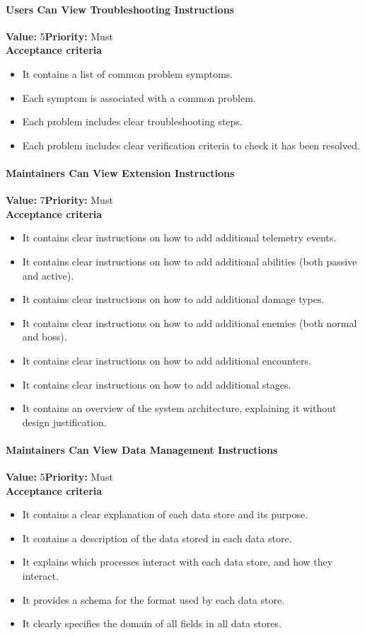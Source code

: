 \paragraph{Users Can View Troubleshooting Instructions}
\textbf{Value:} 5\quad \textbf{Priority:} Must\\
\textbf{Acceptance criteria}
\begin{itemize}
  \item It contains a list of common problem symptoms.
  \item Each symptom is associated with a common problem.
  \item Each problem includes clear troubleshooting steps.
  \item Each problem includes clear verification criteria to check it has been resolved.
\end{itemize}

\paragraph{Maintainers Can View Extension Instructions}
\textbf{Value:} 7\quad \textbf{Priority:} Must\\
\textbf{Acceptance criteria}
\begin{itemize}
  \item It contains clear instructions on how to add additional telemetry events.
  \item It contains clear instructions on how to add additional abilities (both passive and active).
  \item It contains clear instructions on how to add additional damage types.
  \item It contains clear instructions on how to add additional enemies (both normal and boss).
  \item It contains clear instructions on how to add additional encounters.
  \item It contains clear instructions on how to add additional stages.
  \item It contains an overview of the system architecture, explaining it without design justification.
\end{itemize}

\paragraph{Maintainers Can View Data Management Instructions}
\textbf{Value:} 5\quad \textbf{Priority:} Must\\
\textbf{Acceptance criteria}
\begin{itemize}
  \item It contains a clear explanation of each data store and its purpose.
  \item It contains a description of the data stored in each data store.
  \item It explains which processes interact with each data store, and how they interact.
  \item It provides a schema for the format used by each data store.
  \item It clearly specifies the domain of all fields in all data stores.
\end{itemize}

